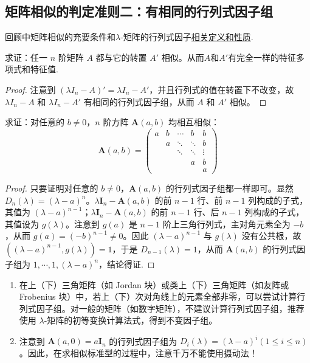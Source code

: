 \documentclass[../../main.tex]{subfiles}
\begin{document}
\subsection{矩阵相似的判定准则二：有相同的行列式因子组}

回顾中矩阵相似的充要条件和$\lambda$-矩阵的行列式因子\hyperref[lemma:i阶行列式因子整除i+1阶行列式因子]{相关定义和性质}.

\begin{proposition}[矩阵必与其转置相似]\label{proposition:lambda-矩阵一定与其转置相似}
求证：任一 $n$ 阶矩阵 $A$ 都与它的转置 $A'$ 相似。从而$A$和$A'$有完全一样的特征多项式和特征值.
\end{proposition}
\begin{proof}
注意到 $(\lambda I_n - A)' = \lambda I_n - A'$，并且行列式的值在转置下不改变，故 $\lambda I_n - A$ 和 $\lambda I_n - A'$ 有相同的行列式因子组，从而 $A$ 和 $A'$ 相似。
\end{proof}

\begin{proposition}\label{proposition:A(a,b)矩阵均相似}
求证：对任意的 $b \neq 0$，$n$ 阶方阵 $\boldsymbol{A}(a,b)$ 均相互相似：
\[
\boldsymbol{A}(a,b) = 
\begin{pmatrix}
a & b & \cdots & b & b \\
 & a & \ddots & \ddots & b \\
 & & \ddots & \ddots & \vdots \\
 & & & a & b \\
 & & & & a
\end{pmatrix}
\]
\end{proposition}
\begin{proof}
只要证明对任意的 $b \neq 0$，$\boldsymbol{A}(a,b)$ 的行列式因子组都一样即可。显然 $D_n(\lambda) = (\lambda - a)^n$。$\lambda \boldsymbol{I}_n - \boldsymbol{A}(a,b)$ 的前 $n - 1$ 行、前 $n - 1$ 列构成的子式，其值为 $(\lambda - a)^{n - 1}$；$\lambda \boldsymbol{I}_n - \boldsymbol{A}(a,b)$ 的前 $n - 1$ 行、后 $n - 1$ 列构成的子式，其值设为 $g(\lambda)$。注意到 $g(a)$ 是 $n - 1$ 阶上三角行列式，主对角元素全为 $-b$，从而 $g(a) = (-b)^{n - 1} \neq 0$。因此 $(\lambda - a)^{n - 1}$ 与 $g(\lambda)$ 没有公共根，故 $((\lambda - a)^{n - 1}, g(\lambda)) = 1$，于是 $D_{n - 1}(\lambda) = 1$，从而 $\boldsymbol{A}(a,b)$ 的行列式因子组为 $1, \cdots, 1, (\lambda - a)^n$，结论得证.
\end{proof}
\begin{remark}
\begin{enumerate}[(1)]
\item 在上（下）三角矩阵（如 Jordan 块）或类上（下）三角矩阵（如友阵或 Frobenius 块）中，若上（下）次对角线上的元素全部非零，可以尝试计算行列式因子组。对一般的矩阵（如数字矩阵），不建议计算行列式因子组，推荐使用 $\lambda$-矩阵的初等变换计算法式，得到不变因子组。


\item 注意到 $\boldsymbol{A}(a,0) = a\boldsymbol{I}_n$ 的行列式因子组为 $D_i(\lambda) = (\lambda - a)^i (1 \leq i \leq n)$。因此，在求相似标准型的过程中，注意千万不能使用摄动法！ 
\end{enumerate}
\end{remark}
\end{document}
